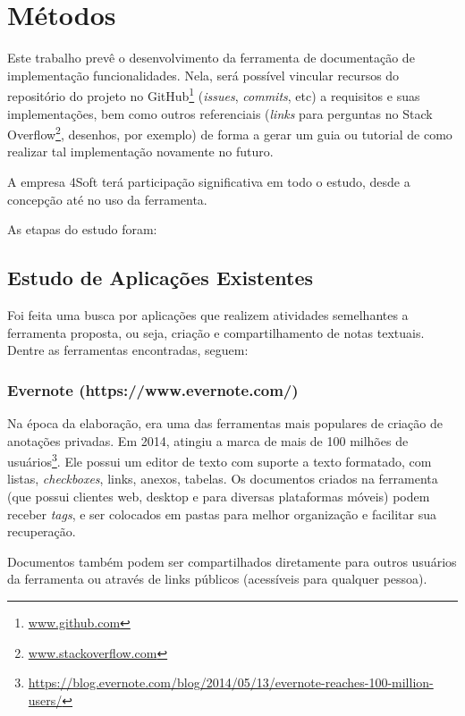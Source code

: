 \chapter{Métodos}

Este trabalho prevê o desenvolvimento da ferramenta de documentação de implementação funcionalidades. Nela, será possível vincular recursos do repositório do projeto no GitHub\footnote{\url{www.github.com}} (\textit{issues}, \textit{commits}, etc) a requisitos e suas implementações, bem como outros referenciais (\textit{links} para perguntas no Stack Overflow\footnote{\url{www.stackoverflow.com}}, desenhos, por exemplo) de forma a gerar um guia ou tutorial de como realizar tal implementação novamente no futuro.

A empresa 4Soft terá participação significativa em todo o estudo, desde a concepção até no uso da ferramenta.

As etapas do estudo foram:

\section{Estudo de Aplicações Existentes}

Foi feita uma busca por aplicações que realizem atividades semelhantes a ferramenta proposta, ou seja, criação e compartilhamento de notas textuais. Dentre as ferramentas encontradas, seguem:

\subsection{Evernote (https://www.evernote.com/)}

Na época da elaboração, era uma das ferramentas mais populares de criação de anotações privadas. Em 2014, atingiu a marca de mais de 100 milhões de usuários\footnote{\url{https://blog.evernote.com/blog/2014/05/13/evernote-reaches-100-million-users/}}. Ele possui um editor de texto com suporte a texto formatado, com listas, \textit{checkboxes}, links, anexos, tabelas. Os documentos criados na ferramenta (que possui clientes web, desktop e para diversas plataformas móveis) podem receber \textit{tags}, e ser colocados em pastas para melhor organização e facilitar sua recuperação.


Documentos também podem ser compartilhados diretamente para outros usuários da ferramenta ou através de links públicos (acessíveis para qualquer pessoa).

